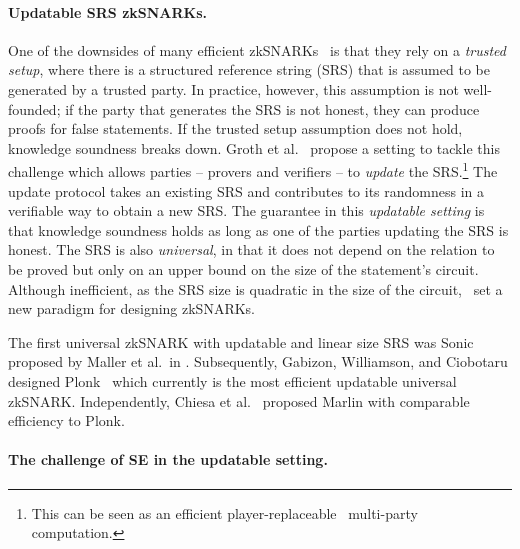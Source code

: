 \documentclass[10pt]{llncs}
\DeclareRobustCommand{\markulf}[2] {}%
\newcommand{\chaya}[2] {} %
\begin{document}
\paragraph{Updatable SRS zkSNARKs.}
One of the downsides of many efficient zkSNARKs~\cite{AC:Groth10a,TCC:Lipmaa12,EC:GGPR13,SP:PHGR13,AC:Lipmaa13,AC:DFGK14,EC:Groth16} is that they rely on a \textit{trusted setup}, where there is a structured reference string (SRS) that is assumed to be generated by a trusted party. In practice, however, this assumption is not well-founded; if the party that generates the SRS is not honest, they can produce proofs for false statements. If the trusted setup assumption does not hold, knowledge soundness breaks down.
Groth et al.~\cite{C:GKMMM18} propose a setting to tackle this challenge which allows parties -- provers and verifiers -- to \emph{update} the SRS.\footnote{This can be seen as an efficient player-replaceable~\cite{EPRINT:GHMVZ17} multi-party computation.} The update protocol takes an existing SRS and contributes to its randomness in a verifiable way to obtain a new SRS. The guarantee in this \textit{updatable setting} is that knowledge soundness holds as long as one of the parties updating the SRS is honest. The SRS is also \emph{universal}, in that it does not depend on the relation to be proved but only on an upper bound on the size of the statement's circuit.
Although inefficient, as the SRS size is quadratic in the size of the circuit,~\cite{C:GKMMM18} set a new
paradigm for designing zkSNARKs.

The first universal zkSNARK with updatable and linear size SRS was
Sonic proposed by Maller et al.~in \cite{CCS:MBKM19}. Subsequently, Gabizon, Williamson, and Ciobotaru designed Plonk~\cite{EPRINT:GabWilCio19} which currently is the
most efficient updatable universal zkSNARK. Independently, Chiesa et
al.~\cite{EC:CHMMVW20} proposed Marlin with comparable efficiency to
Plonk. %

\paragraph{The challenge of SE in the updatable setting.}
\end{document}
